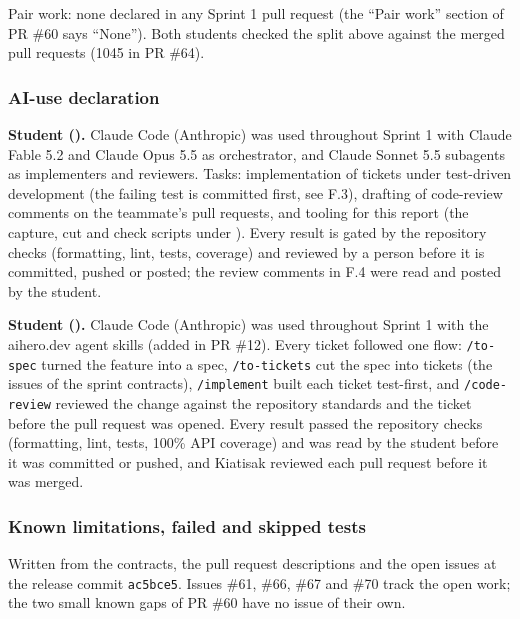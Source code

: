 Pair work: none declared in any Sprint 1 pull request (the ``Pair work'' section of PR \#60 says ``None'').
Both students checked the split above against the merged pull requests (1045 in PR \#64).

\subsubsection*{AI-use declaration}

\textbf{Student \studentOneId{} (\studentOneName).} Claude Code (Anthropic) was used throughout Sprint 1 with Claude Fable 5.2 and Claude Opus 5.5 as orchestrator, and Claude Sonnet 5.5 subagents as implementers and reviewers.
Tasks: implementation of tickets under test-driven development (the failing test is committed first, see F.3), drafting of code-review comments on the teammate's pull requests, and tooling for this report (the capture, cut and check scripts under ).
Every result is gated by the repository checks (formatting, lint, tests, coverage) and reviewed by a person before it is committed, pushed or posted; the review comments in F.4 were read and posted by the student.

\textbf{Student \studentTwoTag{} (\studentTwoName).} Claude Code (Anthropic) was used throughout Sprint 1 with the aihero.dev agent skills (added in PR \#12). Every ticket followed one flow: \texttt{/to-spec} turned the feature into a spec, \texttt{/to-tickets} cut the spec into tickets (the issues of the sprint contracts), \texttt{/implement} built each ticket test-first, and \texttt{/code-review} reviewed the change against the repository standards and the ticket before the pull request was opened. Every result passed the repository checks (formatting, lint, tests, 100\% API coverage) and was read by the student before it was committed or pushed, and Kiatisak reviewed each pull request before it was merged.

\subsubsection*{Known limitations, failed and skipped tests}

Written from the contracts, the pull request descriptions and the open issues at the release commit \texttt{ac5bce5}.
Issues \#61, \#66, \#67 and \#70 track the open work; the two small known gaps of PR \#60 have no issue of their own.

